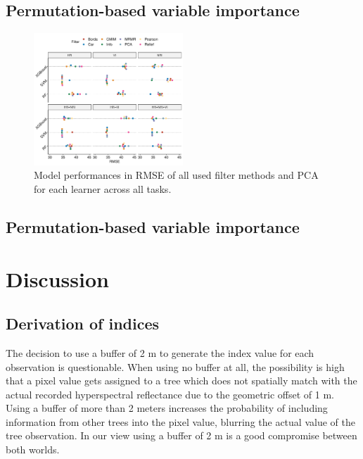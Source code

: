 \documentclass[letterpaper, journal]{IEEEtran}
\begin{document}
\subsection{Permutation-based variable importance}

\begin{figure} [t!]
\centering
	\begin{center}
		\includegraphics[width=0.5\textwidth] {filter-perf-all-1.pdf}
        \caption{Model performances in RMSE of all used filter methods and PCA for each learner across all tasks.}
		\label{fig:filter-perf-all}
	\end{center}
\end{figure}

\subsection{Permutation-based variable importance}
\section{Discussion}

\subsection{Derivation of indices}

\noindent The decision to use a buffer of 2 m to generate the index value for each observation is questionable.
When using no buffer at all, the possibility is high that a pixel value gets assigned to a tree which does not spatially match with the actual recorded hyperspectral reflectance due to the geometric offset of 1 m.
Using a buffer of more than 2 meters increases the probability of including information from other trees into the pixel value, blurring the actual value of the tree observation.
In our view using a buffer of 2 m is a good compromise between both worlds.
\end{document}
